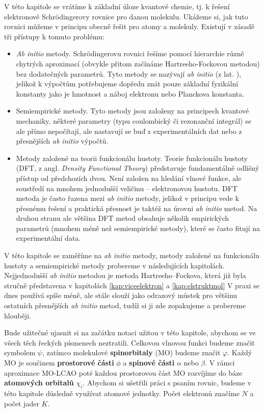 V této kapitole se vrátíme k základní úloze kvantové chemie, tj. k řešení elektronové Schr\"{o}dingerovy rovnice pro danou molekulu. Ukážeme si, jak tuto rovnici můžeme v principu obecně řešit pro atomy a molekuly.  Existují v zásadě tři přístupy k tomuto problému:

\begin{itemize}

\item \textit{Ab initio} metody.  Schr\"{o}dingerovu  rovnici řešíme pomocí hierarchie různě chytrých aproximací (obvykle přitom začínáme Hartreeho-Fockovou metodou) bez dodatečných parametrů. Tyto metody se nazývají \textit{ab initio} (z lat. ), jelikož k výpočtům potřebujeme dopředu znát pouze základní fyzikální konstanty jako je hmotnost a náboj elektronu nebo Planckova konstanta. 

\item Semiempirické metody. Tyto metody jsou založeny na principech kvantové mechaniky, některé parametry (typu coulombický či rezonanční integrál) se ale přímo nepočítají, ale nastavují se buď z experimentálních dat nebo z přesnějších \textit{ab initio} výpočtů.

\item Metody založené na teorii funkcionálu hustoty.  Teorie funkcionálu hustoty (DFT, z angl. \textit{Density Functional Theory}) představuje fundamentálně odlišný přístup od předchozích dvou. Není založen na hledání vlnové funkce, ale soustředí na mnohem jednodušší veličinu -- elektronovou hustotu. DFT metoda je často řazena mezi \textit{ab initio} metody, jelikož v principu vede k přesnému řešení a praktická přesnost je taktéž na úrovni \textit{ab initio} metod. Na druhou stranu ale většina DFT metod obsahuje několik empirických parametrů (mnohem méně než semiempirické metody), které se často fitují na experimentální data.

\end{itemize}

V této kapitole se zaměříme na \textit{ab initio} metody, metody založené na funkcionálu hustoty a semiempirické metody probereme v následujících kapitolách. Nejjednodušší \textit{ab initio} metodou je metoda Hartreeho--Fockova, která již byla stručně představena v kapitolách \ref{kap:viceelektron} a \ref{kap:elstruktmol}
V praxi se dnes používá spíše méně, ale stále slouží jako odrazový můstek pro většinu ostatních přesnějších \textit{ab initio} metod, tudíž si ji zde zopakujeme a probereme hlouběji.

Bude užitečné ujasnit si na začátku notaci užitou v této kapitole, abychom se ve všech těch řeckých písmenech neztratili. Celkovou vlnovou funkci budeme značit symbolem $\psi$,  zatímco molekulové \textbf{spinorbitaly} (MO) budeme značit $\varphi$. Každý MO je součinem \textbf{prostorové části} $\phi$ a \textbf{spinové části} $\alpha$ nebo $\beta$. V rámci aproximace MO-LCAO poté každou prostorovou část MO rozvíjíme do báze \textbf{atomových orbitalů} $\chi_i$. Abychom si ušetřili práci s psaním rovnic, budeme v této kapitole důsledně využívat atomové jednotky. Počet elektronů značíme $N$ a počet jader $K$.

